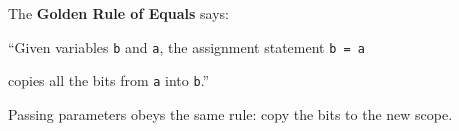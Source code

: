 The \textbf{Golden Rule of Equals} says:

\hspace{10mm}``Given variables \lstinline$b$ and \lstinline$a$, the assignment statement \lstinline$b = a$

\hspace{10mm} copies all the bits from \lstinline$a$ into \lstinline$b$.''

Passing parameters obeys the same rule: copy the bits to the new scope.
